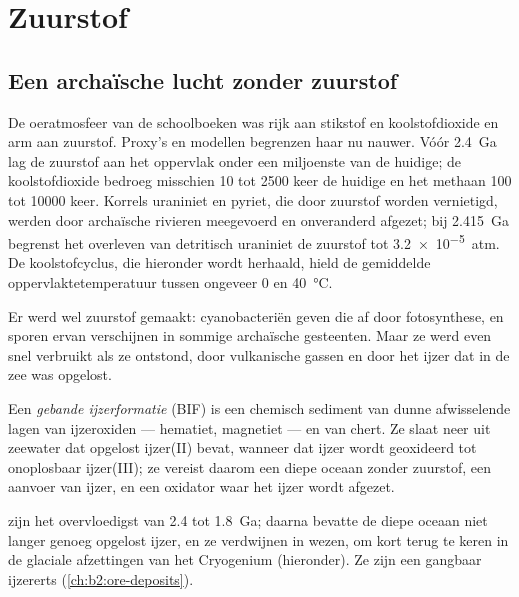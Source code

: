 \section{Zuurstof}\label{sec:b2:precambrian-earth:oxygen}

\subsection*{Een archaïsche lucht zonder zuurstof}

De oeratmosfeer van de schoolboeken was rijk aan stikstof en koolstofdioxide en
arm aan zuurstof. Proxy's en modellen begrenzen haar nu nauwer. Vóór \qty{2.4}{Ga} lag de zuurstof
aan het oppervlak onder een miljoenste van de huidige; de koolstofdioxide bedroeg misschien 10 tot 2500
keer de huidige en het methaan 100 tot \num{10000} keer. Korrels uraniniet en pyriet, die
door zuurstof worden vernietigd, werden door archaïsche rivieren meegevoerd en onveranderd afgezet; bij \qty{2.415}{Ga}
begrenst het overleven van detritisch uraniniet de zuurstof tot \qty{3.2e-5}{atm}. De koolstofcyclus, die hieronder
wordt herhaald, hield de gemiddelde oppervlaktetemperatuur tussen ongeveer 0 en \qty{40}{\celsius}.

Er werd wel zuurstof gemaakt: cyanobacteriën geven die af door fotosynthese, en sporen ervan verschijnen in
sommige archaïsche gesteenten. Maar ze werd even snel verbruikt als ze ontstond, door vulkanische gassen en door het ijzer
dat in de zee was opgelost.

\begin{definition}\label{def:b2:precambrian-earth:bif}
Een \emph{gebande ijzerformatie} (BIF) is een chemisch sediment van
dunne afwisselende lagen van ijzeroxiden --- hematiet, magnetiet --- en van chert. Ze slaat neer
uit zeewater dat opgelost ijzer(II) bevat, wanneer dat ijzer wordt geoxideerd tot onoplosbaar
ijzer(III); ze vereist daarom een diepe oceaan zonder zuurstof, een aanvoer van ijzer, en een oxidator
waar het ijzer wordt afgezet.
\end{definition}

 zijn het overvloedigst van 2.4 tot \qty{1.8}{Ga}; daarna bevatte de diepe oceaan
niet langer genoeg opgelost ijzer, en ze verdwijnen in wezen, om kort terug te keren in de
glaciale afzettingen van het Cryogenium (hieronder). Ze zijn een gangbaar ijzererts
(\cref{ch:b2:ore-deposits}).

